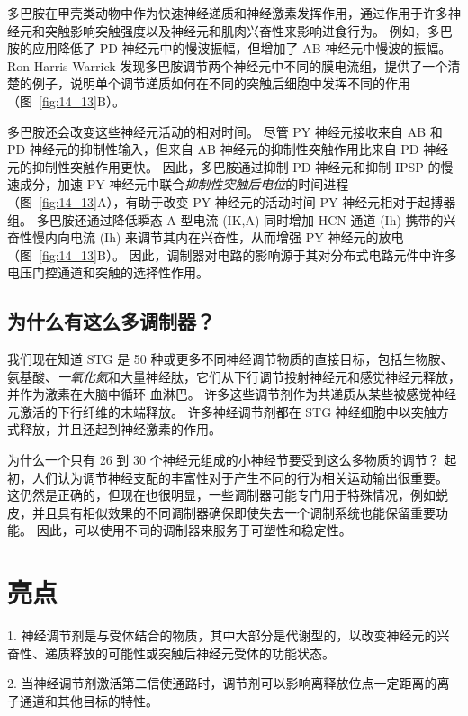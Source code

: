 多巴胺在甲壳类动物中作为快速神经递质和神经激素发挥作用，通过作用于许多神经元和突触影响突触强度以及神经元和肌肉兴奋性来影响进食行为。
例如，多巴胺的应用降低了 PD 神经元中的慢波振幅，但增加了 AB 神经元中慢波的振幅。
Ron Harris-Warrick 发现多巴胺调节两个神经元中不同的膜电流组，提供了一个清楚的例子，说明单个调节递质如何在不同的突触后细胞中发挥不同的作用（图~\ref{fig:14_13}B）。


多巴胺还会改变这些神经元活动的相对时间。
尽管 PY 神经元接收来自 AB 和 PD 神经元的抑制性输入，但来自 AB 神经元的抑制性突触作用比来自 PD 神经元的抑制性突触作用更快。
因此，多巴胺通过抑制 PD 神经元和抑制 IPSP 的慢速成分，加速 PY 神经元中联合\textit{抑制性突触后电位}的时间进程（图~\ref{fig:14_13}A），有助于改变 PY 神经元的活动时间 PY 神经元相对于起搏器组。
多巴胺还通过降低瞬态 A 型电流 (IK,A) 同时增加 HCN 通道 (Ih) 携带的兴奋性慢内向电流 (Ih) 来调节其内在兴奋性，从而增强 PY 神经元的放电（图~\ref{fig:14_13}B）。
因此，调制器对电路的影响源于其对分布式电路元件中许多电压门控通道和突触的选择性作用。



\subsection{为什么有这么多调制器？}

我们现在知道 STG 是 50 种或更多不同神经调节物质的直接目标，包括生物胺、氨基酸、\textit{一氧化氮}和大量神经肽，它们从下行调节投射神经元和感觉神经元释放，并作为激素在大脑中循环 血淋巴。
许多这些调节剂作为共递质从某些被感觉神经元激活的下行纤维的末端释放。
许多神经调节剂都在 STG 神经细胞中以突触方式释放，并且还起到神经激素的作用。


为什么一个只有 26 到 30 个神经元组成的小神经节要受到这么多物质的调节？
起初，人们认为调节神经支配的丰富性对于产生不同的行为相关运动输出很重要。
这仍然是正确的，但现在也很明显，一些调制器可能专门用于特殊情况，例如蜕皮，并且具有相似效果的不同调制器确保即使失去一个调制系统也能保留重要功能。
因此，可以使用不同的调制器来服务于可塑性和稳定性。



\section{亮点}

1. 神经调节剂是与受体结合的物质，其中大部分是代谢型的，以改变神经元的兴奋性、递质释放的可能性或突触后神经元受体的功能状态。


2. 当神经调节剂激活第二信使通路时，调节剂可以影响离释放位点一定距离的离子通道和其他目标的特性。


